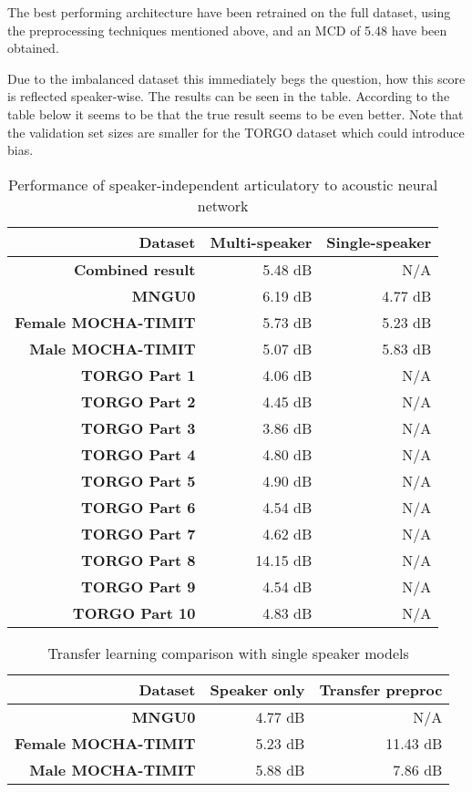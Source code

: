 \documentclass[a4paper]{article}
\begin{document}
The best performing architecture have been retrained on the full dataset, using the preprocessing techniques mentioned above, and an MCD of 5.48 have been obtained.

Due to the imbalanced dataset this immediately begs the question, how this score is reflected speaker-wise. The results can be seen in the table. According to the table below it seems to be that the true result seems to be even better. Note that the validation set sizes are smaller for the TORGO dataset which could introduce bias.

\begin{table}[th]
  \caption{Performance of speaker-independent articulatory to acoustic neural network}
  \label{tab:all_data}
  \centering
  \footnotesize

  \begin{tabular}{ r r r }
    \toprule
    \textbf{Dataset} & Multi-speaker & Single-speaker \\
    \midrule
    \textbf{Combined result} & 5.48 dB & N/A \\  
    \midrule
    \textbf{MNGU0} & 6.19 dB & 4.77 dB \\
    \textbf{Female MOCHA-TIMIT} & 5.73 dB & 5.23 dB \\
    \textbf{Male MOCHA-TIMIT} & 5.07 dB & 5.83 dB \\
    \textbf{TORGO Part 1} & 4.06 dB & N/A \\
    \textbf{TORGO Part 2} & 4.45 dB & N/A \\
    \textbf{TORGO Part 3} & 3.86 dB & N/A \\
    \textbf{TORGO Part 4} & 4.80 dB & N/A \\
    \textbf{TORGO Part 5} & 4.90 dB & N/A \\
    \textbf{TORGO Part 6} & 4.54 dB & N/A \\
    \textbf{TORGO Part 7} & 4.62 dB & N/A \\
    \textbf{TORGO Part 8} & 14.15 dB & N/A\\
    \textbf{TORGO Part 9} & 4.54 dB & N/A \\
    \textbf{TORGO Part 10} & 4.83 dB & N/A \\
    \bottomrule
  \end{tabular}
\end{table}


\begin{table}[th]
  \caption{Transfer learning comparison with single speaker models}
  \label{tab:transfer}
  \centering
  \footnotesize

  \begin{tabular}{ r r r}
    \toprule
    \textbf{Dataset} & \textbf{Speaker only} & \textbf{Transfer preproc} \\
    \midrule
    \textbf{MNGU0} & 4.77 dB & N/A \\
    \textbf{Female MOCHA-TIMIT} & 5.23 dB & 11.43 dB \\
    \textbf{Male MOCHA-TIMIT} & 5.88 dB & 7.86 dB \\
    \bottomrule
  \end{tabular}
\end{table}
\end{document}
